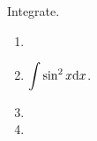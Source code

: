 Integrate.
\begin{multicols}{2}
\begin{enumerate}[ref={\fcProblemRef}]
\item 
\item $\displaystyle \int \sin^2 x{\normalfont \text{d}} x$.

\item 

\item 

\end{enumerate}
\end{multicols}